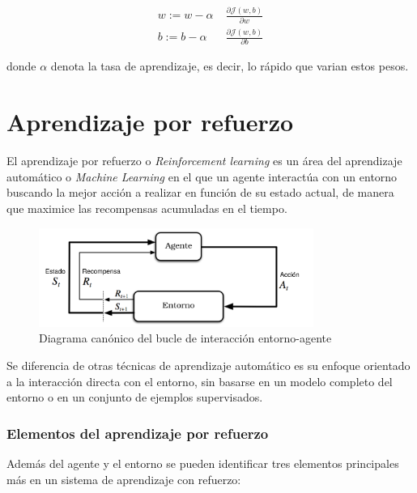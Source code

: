  \begin{align}
 	w:= w - \alpha\; &\frac{\partial\mathcal{J}(w,b)}{\partial w}\\
 	b:= b - \alpha\; &\frac{\partial\mathcal{J}(w,b)}{\partial b}
 \end{align}
 
 donde $\alpha$ denota la tasa de aprendizaje, es decir, lo rápido que varian estos pesos.

 



\section{Aprendizaje por refuerzo}

El aprendizaje por refuerzo o \textit{Reinforcement learning} \cite{sutton2018reinforcement} es un área del aprendizaje automático o \textit{Machine Learning} en el que un agente interactúa con un entorno buscando la mejor acción a realizar en función de su estado actual, de manera que maximice las recompensas acumuladas en el tiempo.


\begin{figure}[htb!]
	\centering
	\includegraphics[width=0.8\textwidth]{background/RL_diagram}
	\caption{Diagrama canónico del bucle de interacción entorno-agente}
	\label{Rl-diagram}
\end{figure}


Se diferencia de otras técnicas de aprendizaje automático es su enfoque orientado a la interacción directa con el entorno, sin basarse en un modelo completo del entorno o en un conjunto de ejemplos supervisados.

\subsubsection{Elementos del aprendizaje por refuerzo}
Además del agente y el entorno se pueden identificar tres elementos principales más en un sistema de aprendizaje con refuerzo:

